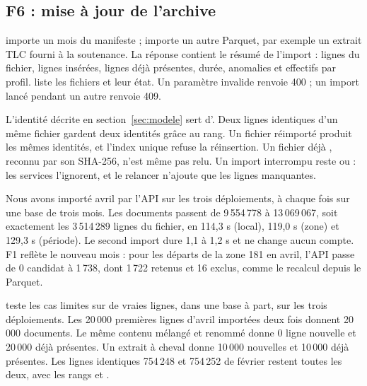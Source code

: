 \subsection{F6 : mise à jour de l'archive}\label{sec:f6}
 importe un mois du manifeste ;
 importe un autre Parquet, par exemple un extrait
TLC fourni à la soutenance. La réponse contient le résumé de l'import : lignes du
fichier, lignes insérées, lignes déjà présentes, durée, anomalies et effectifs par
profil.  liste les fichiers et leur état. Un paramètre invalide
renvoie 400 ; un import lancé pendant un autre renvoie 409.

L'identité décrite en section~\ref{sec:modele} sert d'. Deux lignes
identiques d'un même fichier gardent deux identités grâce au rang. Un fichier réimporté
produit les mêmes identités, et l'index unique refuse la réinsertion. Un fichier déjà
, reconnu par son SHA-256, n'est même pas relu. Un import interrompu reste
 ou  : les services l'ignorent, et le relancer n'ajoute que
les lignes manquantes.

Nous avons importé avril par l'API sur les trois déploiements, à chaque fois sur une base de
trois mois. Les documents passent de 9\,554\,778 à 13\,069\,067, soit exactement les
3\,514\,289 lignes du fichier, en 114,3 s (local), 119,0 s (zone) et 129,3 s (période).
Le second import dure 1,1 à 1,2 s et ne change aucun compte. F1 reflète le nouveau mois :
pour les départs de la zone 181 en avril, l'API passe de 0 candidat à 1\,738, dont
1\,722 retenus et 16 exclus, comme le recalcul depuis le Parquet.

 teste les cas limites sur de vraies lignes, dans une base à part, sur
les trois déploiements. Les 20\,000 premières lignes d'avril importées deux fois donnent
20\,000 documents. Le même contenu mélangé et renommé donne 0 ligne nouvelle et 20\,000
déjà présentes. Un extrait à cheval donne 10\,000 nouvelles et 10\,000 déjà présentes.
Les lignes identiques 754\,248 et 754\,252 de février restent toutes les deux, avec
les rangs  et  \cite{experiences}.
